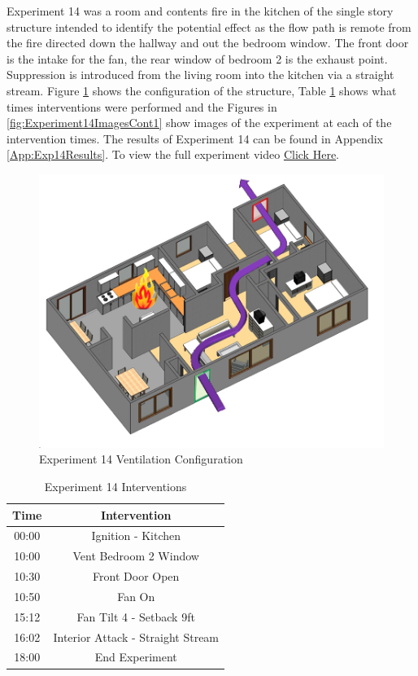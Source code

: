 \documentclass{article}
\begin{document}
Experiment 14 was a room and contents fire in the kitchen of the single story structure intended to identify the potential effect as the flow path is remote from the fire directed down the hallway and out the bedroom window. The front door is the intake for the fan, the rear window of bedroom 2 is the exhaust point. Suppression is introduced from the living room into the kitchen via a straight stream. Figure \ref{fig:Exp14VentConfig} shows the configuration of the structure, Table \ref{Table:Exp14Interventions} shows what times interventions were performed and the Figures in \ref{fig:Experiment14ImagesCont1} show images of the experiment at each of the intervention times. The results of Experiment 14 can be found in Appendix \ref{App:Exp14Results}. To view the full experiment video \href{https://youtu.be/WzkDldq_ECA}{Click Here}.

\begin{figure}[H]
	\centering
	\includegraphics[width=5in]{0_Images/FireExperiments/Single_Story/Experiment_14.jpg}
	\caption{Experiment 14 Ventilation Configuration}
	\label{fig:Exp14VentConfig}
\end{figure}

\begin{table}[H]
	\centering
	\caption{Experiment 14 Interventions}
	\begin{tabular}{|c|c|} 
		\hline
		Time & Intervention \\ \hline \hline
		00:00 & Ignition - Kitchen \\ \hline
		10:00 & Vent Bedroom 2 Window \\ \hline
		10:30 & Front Door Open \\ \hline
		10:50 & Fan On \\ \hline
		15:12 & Fan Tilt 4 - Setback 9ft \\ \hline
		16:02 & Interior Attack - Straight Stream \\ \hline
		18:00 & End Experiment \\ \hline
	\end{tabular}
	\label{Table:Exp14Interventions}
\end{table}
\end{document}
